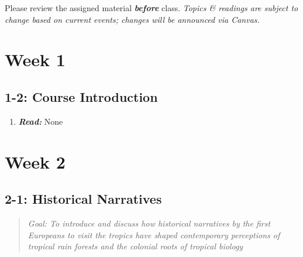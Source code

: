 \documentclass[
  10pt,
  letterpaper,
  oneside,
  open=any]{scrbook}
\providecommand{\tightlist}{%
  \setlength{\itemsep}{0pt}\setlength{\parskip}{0pt}}\usepackage{longtable,booktabs,array}
\begin{document}
\begin{tcolorbox}[enhanced jigsaw, toptitle=1mm, arc=.35mm, opacitybacktitle=0.6, colbacktitle=quarto-callout-important-color!10!white, titlerule=0mm, colback=white, opacityback=0, colframe=quarto-callout-important-color-frame, coltitle=black, left=2mm, toprule=.15mm, title=\textcolor{quarto-callout-important-color}{\faExclamation}\hspace{0.5em}{Important}, breakable, leftrule=.75mm, bottomtitle=1mm, rightrule=.15mm, bottomrule=.15mm]

Please review the assigned material \textbf{\emph{before}} class.
\emph{Topics \& readings are subject to change based on current events;
changes will be announced via Canvas.}

\end{tcolorbox}

\section*{Week 1}\label{week-1}


\subsection*{1-2: Course Introduction}\label{course-introduction}

\begin{enumerate}
\def\labelenumi{\arabic{enumi}.}
\tightlist
\item
  \textbf{\emph{Read:}} None
\end{enumerate}

\section{Week 2}\label{week-2}

\subsection*{2-1: Historical Narratives}\label{historical-narratives}

\begin{quote}
\emph{Goal: To introduce and discuss how historical narratives by the
first Europeans to visit the tropics have shaped contemporary
perceptions of tropical rain forests and the colonial roots of tropical
biology}
\end{quote}
\end{document}

